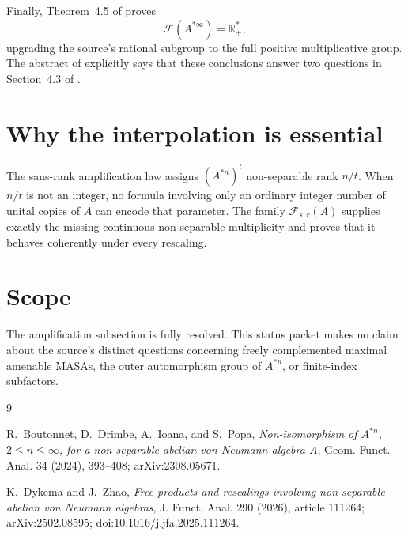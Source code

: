 \documentclass[11pt]{article}
\newcommand{\Fcal}{\mathcal F}
\begin{document}
Finally, Theorem~4.5 of \cite{DZ} proves
\[
 \boxed{\Fcal(A^{*\infty})=\mathbb R_+^*},
\]
upgrading the source's rational subgroup to the full positive multiplicative
group.  The abstract of \cite{DZ} explicitly says that these conclusions
answer two questions in Section~4.3 of \cite{BDIP}.

\section*{Why the interpolation is essential}

The sans-rank amplification law assigns $(A^{*n})^t$ non-separable rank
$n/t$.  When $n/t$ is not an integer, no formula involving only an ordinary
integer number of unital copies of $A$ can encode that parameter.  The family
$\Fcal_{s,r}(A)$ supplies exactly the missing continuous non-separable
multiplicity and proves that it behaves coherently under every rescaling.

\section*{Scope}

The amplification subsection is fully resolved.  This status packet makes no
claim about the source's distinct questions concerning freely complemented
maximal amenable MASAs, the outer automorphism group of $A^{*n}$, or
finite-index subfactors.

\begin{thebibliography}{9}
\raggedright

R.~Boutonnet, D.~Drimbe, A.~Ioana, and S.~Popa,
\emph{Non-isomorphism of $A^{*n}$, $2\le n\le\infty$, for a non-separable
abelian von Neumann algebra $A$},
Geom. Funct. Anal. 34 (2024), 393--408; arXiv:2308.05671.

K.~Dykema and J.~Zhao,
\emph{Free products and rescalings involving non-separable abelian von
Neumann algebras},
J. Funct. Anal. 290 (2026), article 111264; arXiv:2502.08595;
doi:10.1016/j.jfa.2025.111264.

\end{thebibliography}
\end{document}
